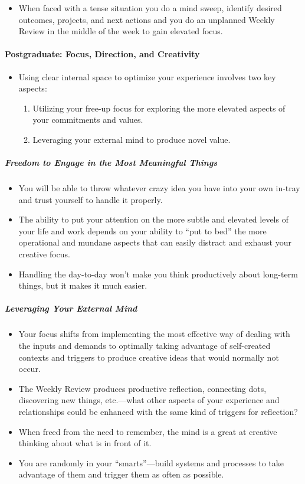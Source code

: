\documentclass{article}
\begin{document}
\begin{itemize}
 \item When faced with a tense situation you do a mind sweep, identify desired outcomes, projects, and next actions and you do an unplanned Weekly Review in the middle of the week to gain elevated focus.
\end{itemize}

\paragraph{Postgraduate: Focus, Direction, and Creativity}

\begin{itemize}
 \item Using clear internal space to optimize your experience involves two key aspects:
 \begin{enumerate}
  \item Utilizing your free-up focus for exploring the more elevated aspects of your commitments and values.
  \item Leveraging your external mind to produce novel value.
 \end{enumerate}
\end{itemize}

\subparagraph{Freedom to Engage in the Most Meaningful Things}

\begin{itemize}
 \item You will be able to throw whatever crazy idea you have into your own in-tray and trust yourself to handle it properly.
 \item The ability to put your attention on the more subtle and elevated levels of your life and work depends on your ability to ``put to bed'' the more operational and mundane aspects that can easily distract and exhaust your creative focus.
 \item Handling the day-to-day won't make you think productively about long-term things, but it makes it much easier.
\end{itemize}

\subparagraph{Leveraging Your External Mind}

\begin{itemize}
 \item Your focus shifts from implementing the most effective way of dealing with the inputs and demands to optimally taking advantage of self-created contexts and triggers to produce creative ideas that would normally not occur.
 \item The Weekly Review produces productive reflection, connecting dots, discovering new things, etc.---what other aspects of your experience and relationships could be enhanced with the same kind of triggers for reflection?
 \item When freed from the need to remember, the mind is a great at creative thinking about what is in front of it.
 \item You are randomly in your ``smarts''---build systems and processes to take advantage of them and trigger them as often as possible.
\end{itemize}
\end{document}
